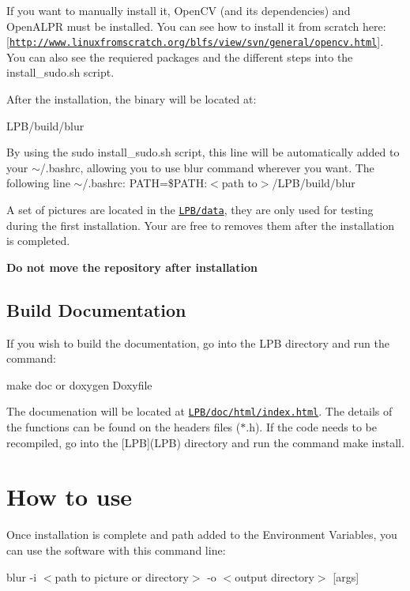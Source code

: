 If you want to manually install it, Open\+CV (and it\textquotesingle{}s dependencies) and Open\+A\+L\+PR must be installed. You can see how to install it from scratch here\+: \mbox{[}\href{http://www.linuxfromscratch.org/blfs/view/svn/general/opencv.html}{\tt http\+://www.\+linuxfromscratch.\+org/blfs/view/svn/general/opencv.\+html}\mbox{]}. You can also see the requiered packages and the different steps into the {\ttfamily install\+\_\+sudo.\+sh} script.

After the installation, the binary will be located at\+:

{\ttfamily L\+P\+B/build/blur}

By using the {\ttfamily sudo install\+\_\+sudo.\+sh} script, this line will be automatically added to your {\ttfamily $\sim$/.bashrc}, allowing you to use {\ttfamily blur} command wherever you want. The following line {\ttfamily $\sim$/.bashrc}\+: {\ttfamily P\+A\+TH=\$\+P\+A\+TH\+:$<$path to$>$/\+L\+P\+B/build/blur}

A set of pictures are located in the \href{LPB/data}{\tt L\+P\+B/data}, they are only used for testing during the first installation. Your are free to removes them after the installation is completed.

{\bfseries Do not move the repository after installation}

\subsection*{Build Documentation}

If you wish to build the documentation, go into the L\+PB directory and run the command\+:

{\ttfamily make doc} or {\ttfamily doxygen Doxyfile}

The documenation will be located at \href{LPB/doc/html/index.html}{\tt L\+P\+B/doc/html/index.\+html}. The details of the functions can be found on the headers files ($\ast$.h). If the code needs to be recompiled, go into the \mbox{[}L\+PB\mbox{]}(L\+PB) directory and run the command {\ttfamily make install}.

\section*{How to use}

Once installation is complete and path added to the Environment Variables, you can use the software with this command line\+:

{\ttfamily blur -\/i $<$path to picture or directory$>$ -\/o $<$output directory$>$ \mbox{[}args\mbox{]}}

